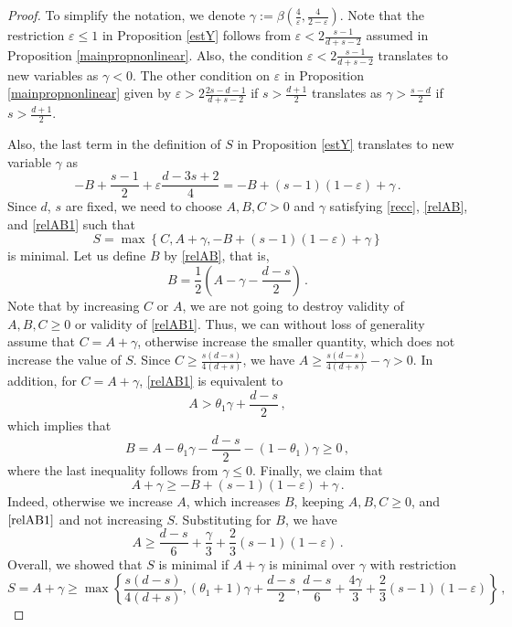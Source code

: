 \documentclass[aihp]{imsart}
\numberwithin{equation}{section}
\theoremstyle{plain}
\theoremstyle{remark}
\begin{document}
\begin{proof}
To simplify the notation, we denote $\gamma := \beta \left(\frac{4}{\varepsilon} , \frac{4}{2-\varepsilon}\right)$.
Note that the restriction $\varepsilon \leq 1$ in Proposition \ref{estY} follows from $\varepsilon < 2\frac{s - 1}{d + s - 2}$ assumed in  Proposition \ref{mainpropnonlinear}. 
Also, the condition $\varepsilon < 2\frac{s - 1}{d + s - 2}$ translates to new variables as $\gamma < 0$. 
The other condition on $\varepsilon$ in Proposition \ref{mainpropnonlinear} given by $\varepsilon > 2\frac{2s - d -1}{d+ s - 2}$ if $s > \frac{d + 1}{2}$ translates 
as $\gamma > \frac{s - d}{2}$ if $s > \frac{d + 1}{2}$.

Also, the last term in the definition of $S$ in Proposition \ref{estY} translates to new variable $\gamma$ as 
$$
-B+\frac{s-1}{2} + \varepsilon  \frac{d -3s+2}{4} = -B + (s - 1)(1 - \varepsilon) + \gamma \,.
$$
Since $d$, $s$ are fixed, we need to choose $A, B, C > 0$ and $\gamma$ satisfying \eqref{recc},  \eqref{relAB}, and \eqref{relAB1} such that 
$$S=\max \left\{C, A + \gamma, -B+ (s - 1)(1 - \varepsilon) + \gamma \right\}$$
is minimal. Let us define $B$ by \eqref{relAB}, that is, 
$$
B = \frac{1}{2}\left(A - \gamma - \frac{d-s}{2} \right)\,.
$$
Note that by increasing $C$ or $A$, we are not going to destroy validity of $A, B, C \geq 0$ or validity of \eqref{relAB1}. Thus, we can without loss of generality assume that $C = A + \gamma$, otherwise 
increase the smaller quantity, which does not increase the value of $S$. Since $C \geq \frac{s(d - s)}{4(d + s)}$, we have $A \geq \frac{s(d - s)}{4(d + s)}- \gamma > 0$.  
In addition, for $C = A + \gamma$, \eqref{relAB1} is equivalent to 
$$
A  > \theta_1 \gamma + \frac{d - s}{2} \,,
$$
which implies that
$$
B= A - \theta_1\gamma - \frac{d - s}{2} - (1 - \theta_1)\gamma \geq 0 \,,
$$
where the last inequality follows from $\gamma \leq 0$. Finally, we claim that 
$$
A + \gamma \geq -B+ (s - 1)(1 - \varepsilon) + \gamma \,.
$$
Indeed, otherwise we increase $A$, which increases $B$, keeping $A, B, C \geq 0$, and $\eqref{relAB1}$ and not increasing $S$. Substituting for $B$, we have 
$$
A  \geq  \frac{d - s}{6} + \frac{\gamma}{3} + \frac{2}{3}(s - 1)(1 - \varepsilon) \,.
$$
Overall, we showed that $S$ is minimal if $A + \gamma$ is minimal over $\gamma$ with restriction 
\begin{equation}\label{opm}
S = A + \gamma \geq \max \left\{\frac{s(d - s)}{4(d + s)},  (\theta_1 + 1) \gamma + \frac{d - s}{2},  \frac{d - s}{6} + \frac{4\gamma}{3} + \frac{2}{3}(s - 1)(1 - \varepsilon)  \right\} \,,

\end{equation}
\end{proof}
\end{document}
